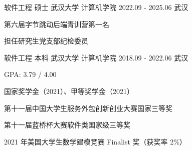 

\begin{cventries}

  \cventry
    {软件工程 \quad 硕士} %
    {武汉大学 \quad 计算机学院} %
    {2022.09 - 2025.06} %
    {武汉} %
    {
      \begin{cvitems} %
        \item {第六届字节跳动后端青训营第一名}
        \item 担任研究生党支部纪检委员
      \end{cvitems}
    }

  \cventry
    {软件工程 \quad 本科} %
    {武汉大学 \quad 计算机学院} %
    {2018.09 - 2022.06} %
    {武汉} %
    {
      \begin{cvitems} %
        \item {GPA: 3.79 / 4.00}
        \item {国家奖学金（2021）、甲等奖学金（2021）}
        \item {第十一届中国大学生服务外包创新创业大赛国家三等奖}
        \item {第十一届蓝桥杯大赛软件类国家级三等奖}
        \item {2021 年美国大学生数学建模竞赛 Finalist 奖（获奖率 2\%）}
      \end{cvitems}
    }

\end{cventries}
